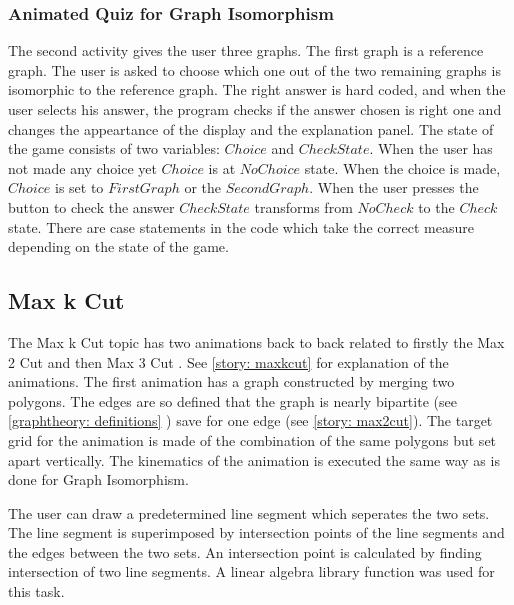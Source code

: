 \subsubsection{Animated Quiz for Graph Isomorphism}
The second activity gives the user three graphs. The first graph is a reference
graph. The user is asked to choose which one out of the two remaining graphs is
isomorphic to the reference graph. The right answer is hard coded, and when the
user selects his answer, the program checks if the answer chosen is right one
and changes the appeartance of the display and the explanation panel.  The
state of the game consists of two variables: $Choice$ and $CheckState$.  When
the user has not made any choice yet $Choice$ is at $NoChoice$ state.  When the
choice is made, $Choice$ is set to $FirstGraph$ or the $SecondGraph$.  When the
user presses the button to check the answer $CheckState$ transforms from
$NoCheck$ to the $Check$ state.  There are case statements in the code which
take the correct measure depending on the state of the game.

\subsection{Max k Cut}
\label{impl: maxkcut}
The Max k Cut topic has two animations back to back related to firstly the Max
2 Cut and then Max 3 Cut . See \autoref{story: maxkcut} for explanation of the
animations. The first animation has a graph constructed by merging two polygons.
The edges are so defined that the graph is nearly bipartite (see
\autoref{graphtheory: definitions} ) save for one edge (see \autoref{story:
max2cut}). The target grid for the animation is made of the combination of the
same polygons but set apart vertically. The kinematics of the animation is
executed the same way as is done for Graph Isomorphism.

The user can draw a predetermined line segment which seperates the two
sets. The line segment is superimposed by intersection points of the
line segments and the edges between the two sets. An intersection point
is calculated by finding intersection of two line segments. A linear algebra
library function was used for this task.


